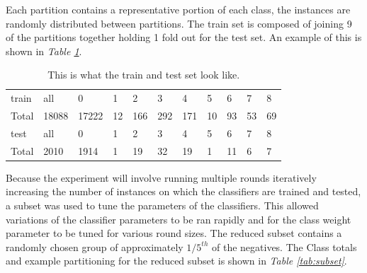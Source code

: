 \documentclass[ms]{nuthesis}
\begin{document}
\par Each partition contains a representative portion of each class, the instances are randomly
distributed between partitions. The train set is composed of joining 9 of the partitions together
holding 1 fold out for the test set. An example of this is shown in \textit{Table \ref{tab:TrainTest}}.

\FloatBarrier
\begin{table}[H]
  \centering
  \begin{tabular}{|l||l||l||l||l||l||l||l||l||l||l|}\toprule
    train & all & 0 & 1 & 2 & 3 & 4 & 5 & 6 & 7 & 8 \\
    Total & 18088 & 17222 & 12 & 166 & 292 & 171 & 10 & 93 & 53 & 69 \\ \midrule
    test & all &  0 & 1 & 2 & 3 & 4 & 5 & 6 & 7 & 8 \\
    Total & 2010 & 1914 & 1 & 19 & 32 & 19 & 1 & 11 & 6 & 7 \\
 \bottomrule
  \end{tabular}
  \caption{This is what the train and test set look like.}
  \label{tab:TrainTest}
\end{table}
\FloatBarrier

\par Because the experiment will involve running multiple rounds iteratively increasing the
number of instances on which the classifiers are trained and tested, a subset was used to
tune the parameters of the classifiers. This allowed variations of the classifier parameters to be
ran rapidly and for the class weight parameter to be tuned for various round sizes. The reduced subset
contains a randomly chosen group of approximately $1/5^{th}$ of the negatives. The Class totals and example
partitioning for the reduced subset is shown in \textit{Table \ref{tab:subset}}.
\end{document}

